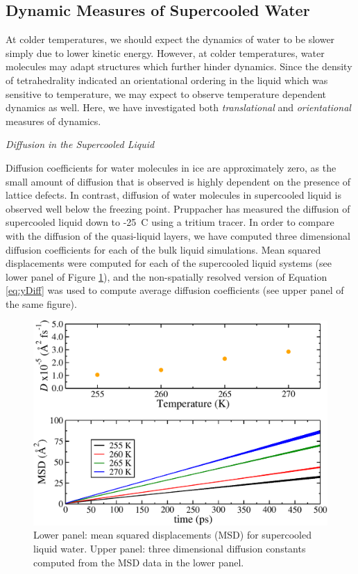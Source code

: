 \subsection{Dynamic Measures of Supercooled Water}
At colder temperatures, we should expect the dynamics of water to be
slower simply due to lower kinetic energy. However, at colder
temperatures, water molecules may adapt structures which further hinder
dynamics. Since the density of tetrahedrality indicated an
orientational ordering in the liquid which was sensitive to
temperature, we may expect to observe temperature dependent dynamics
as well. Here, we have investigated both \textit{translational} and
\textit{orientational} measures of dynamics.

\begin{flushleft}
\textit{Diffusion in the Supercooled Liquid}
\end{flushleft}

Diffusion coefficients for water molecules in ice are approximately
zero, as the small amount of diffusion that is observed is highly
dependent on the presence of lattice defects. In contrast, diffusion
of water molecules in supercooled liquid is observed well below the
freezing point.\cite{Debenedetti2003} Pruppacher has measured the
diffusion of supercooled liquid down to -25\degree~C using a tritium
tracer.\cite{Pruppacher1972} In order to compare with the diffusion of
the quasi-liquid layers, we have computed three dimensional diffusion
coefficients for each of the bulk liquid simulations. Mean squared
displacements were computed for each of the supercooled liquid systems
(see lower panel of Figure \ref{fig:bulkD}), and the non-spatially
resolved version of Equation \eqref{eq:yDiff} was used to compute
average diffusion coefficients (see upper panel of the same figure).

\begin{figure}
\includegraphics[width=\linewidth]{Figures/bulkD}
\caption{\label{fig:bulkD} Lower panel: mean squared displacements
  (MSD) for supercooled liquid water. Upper panel: three dimensional
  diffusion constants computed from the MSD data in the lower panel. }
\end{figure}    
 
